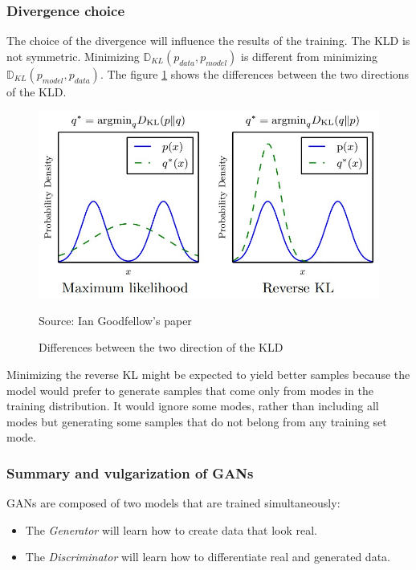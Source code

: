 \documentclass[12pt]{report}
\begin{document}
\subsubsection{Divergence choice}

The choice of the divergence will influence the results of the training.
The KLD is not symmetric.
Minimizing $\mathbb{D}_{KL}(p_{data}, p_{model})$ is different from minimizing $\mathbb{D}_{KL}(p_{model}, p_{data})$.
The figure \ref{fig:gan:directions-kld} shows the differences between the two directions of the KLD.
\begin{figure}[htbp]
    \centering
    \includegraphics[width=\textwidth]{images/nn/graphs/reverse-kl.jpg}
    \caption{Differences between the two direction of the KLD}
    Source: Ian Goodfellow's paper \cite{goodfellow_nips_2017}
    \label{fig:gan:directions-kld}
\end{figure}
Minimizing the reverse KL might be expected to yield better samples because the model would prefer to generate samples that come only from modes in the training distribution.
It would ignore some modes, rather than including all modes but generating some samples that do not belong from any training set mode.

\subsubsection{Summary and vulgarization of GANs}

GANs are composed of two models that are trained simultaneously:
\begin{itemize}
    \item The \textit{Generator} will learn how to create data that look real.
    \item The \textit{Discriminator} will learn how to differentiate real and generated data.
\end{itemize}
\end{document}

